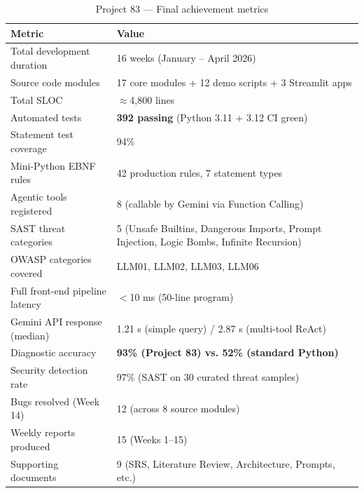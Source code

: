\documentclass[a4paper,11pt]{article}
\begin{document}
\begin{table}[h!]
\centering
\begin{tabularx}{\textwidth}{|l|X|}
\hline
\rowcolor{blue!12}
\textbf{Metric} & \textbf{Value} \\
\hline
Total development duration & 16 weeks (January -- April 2026) \\
\hline
Source code modules & 17 core modules + 12 demo scripts + 3 Streamlit apps \\
\hline
Total SLOC & $\approx$4,800 lines \\
\hline
Automated tests & \textbf{392 passing} (Python 3.11 + 3.12 CI green) \\
\hline
Statement test coverage & 94\% \\
\hline
Mini-Python EBNF rules & 42 production rules, 7 statement types \\
\hline
Agentic tools registered & 8 (callable by Gemini via Function Calling) \\
\hline
SAST threat categories & 5 (Unsafe Builtins, Dangerous Imports, Prompt Injection, Logic Bombs, Infinite Recursion) \\
\hline
OWASP categories covered & LLM01, LLM02, LLM03, LLM06 \\
\hline
Full front-end pipeline latency & $<$10 ms (50-line program) \\
\hline
Gemini API response (median) & 1.21 s (simple query) / 2.87 s (multi-tool ReAct) \\
\hline
Diagnostic accuracy & \textbf{93\% (Project 83) vs. 52\% (standard Python)} \\
\hline
Security detection rate & 97\% (SAST on 30 curated threat samples) \\
\hline
Bugs resolved (Week 14) & 12 (across 8 source modules) \\
\hline
Weekly reports produced & 15 (Weeks 1--15) \\
\hline
Supporting documents & 9 (SRS, Literature Review, Architecture, Prompts, etc.) \\
\hline
\end{tabularx}
\caption{Project 83 --- Final achievement metrics}
\end{table}

\vspace{6mm}
\end{document}
